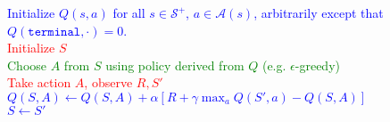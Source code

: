 \documentclass{standalone}
\begin{document}
\pagestyle{empty}
\begin{algorithm}[H]
  \KwInput{Step size $\alpha \in (0, 1]$, and a small $\epsilon > 0$.}
  \textcolor{blue}{Initialize $Q(s,a)$ for all $s \in \mathcal S^+$, $a \in \mathcal A(s)$,   arbitrarily except that $Q(\texttt{terminal}, \cdot) = 0$.\\}
 {
  \textcolor{red}{Initialize $S$} \\
   {
\textcolor{Green}{Choose $A$ from $S$ using policy derived from $Q$ (e.g. $\epsilon$-greedy)} \\
\textcolor{red}{Take action $A$, observe $R, S'$ \\}
\textcolor{blue}{
    $Q(S,A) \gets Q(S,A) + \alpha \left[R + \gamma \max_a Q(S', a) -       Q(S,A)\right]$ \\
    $S \gets S'$}
  }
}
\end{algorithm}
\end{document}
